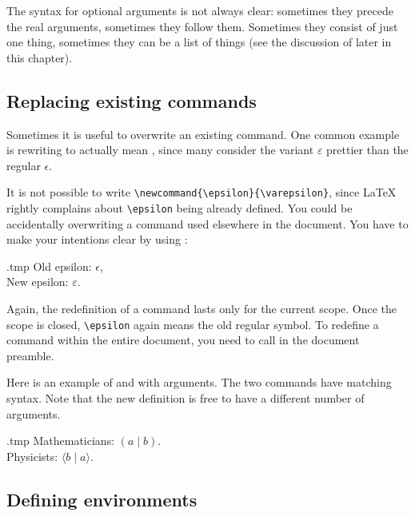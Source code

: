 The syntax for optional arguments is not always clear:
sometimes they precede the real arguments, sometimes they follow them.
Sometimes they consist of just one thing,
sometimes they can be a list of things
(see the discussion of  later in this chapter).



%
\subsection{Replacing existing commands}

Sometimes it is useful to overwrite an existing command.
One common example is rewriting  to actually mean ,
since many consider the variant $\varepsilon$ prettier than the regular $\epsilon$.

It is not possible to write \verb|\newcommand{\epsilon}{\varepsilon}|,
since \LaTeX{} rightly complains about \verb|\epsilon| being already defined.
You could be accidentally overwriting a command used elsewhere in the document.
You have to make your intentions clear by using :

\begin{VerbatimOut}{\jobname.tmp}
Old epsilon: $\epsilon$,\\
\renewcommand{\epsilon}{\varepsilon}
New epsilon: $\epsilon$.
\end{VerbatimOut}
\ShowExample
%
Again, the redefinition of a command lasts only for the current scope.
Once the scope is closed, \verb|\epsilon| again means the old regular symbol.
To redefine a command within the entire document,
you need to call  in the document preamble.

Here is an example of  and  with arguments.
The two commands have matching syntax.
Note that the new definition is free to have a different number of arguments.

\begin{VerbatimOut}{\jobname.tmp}
\newcommand{\dual}[2]{(#1 \mid #2)}
Mathematicians: $\dual{a}{b}$.\\
\renewcommand{\dual}[2]
  {\langle#2 \mid #1\rangle}
Physicists: $\dual{a}{b}$.
\end{VerbatimOut}
\ShowExample




%
\subsection{Defining environments}

